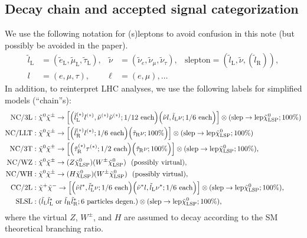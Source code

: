 \documentclass[a4paper,10pt,captions=tableheading,DIV=14]{scrartcl}
\numberwithin{equation}{section}
\newcommand\w[1]{_{\mathrm{#1}}}
\newcommand\lL{\tilde l\w L}
\newcommand\lR{\tilde l\w R}
\newcommand\neut  [1][\relax]{{\tilde\chi^0_{#1}}}
\newcommand\charP [1][\relax]{{\tilde\chi^+_{#1}}}
\newcommand\charM [1][\relax]{{\tilde\chi^-_{#1}}}
\newcommand\charPM[1][\relax]{{\tilde\chi^\pm_{#1}}}
\begin{document}
\subsection{Decay chain and accepted signal categorization}
We use the following notation for (s)leptons to avoid confusion in this note (but possibly be avoided in the paper).
\begin{align*}
\lL &= (\tilde e\w L, \tilde \mu\w L, \tilde\tau\w L),
&
\tilde\nu &= (\tilde \nu_e, \tilde\nu_\mu, \tilde\nu_\tau),
&
\text{slepton}=(\lL,\tilde\nu, (\lR)),
\\
l&=(e,\mu,\tau),
&
\ell&=(e,\mu),\dots
\end{align*}
In addition, to reinterpret LHC analyses, we use the following labels for simplified models (``chain''s):
\begin{align}
 \text{NC/3L}&: \neut\charPM\to
\left[
\Bigl(\lL^{(*)}l^{(*)},\tilde\nu^{(*)}\tilde\nu^{(*)};\text{1/12 each}\Bigr)
\Bigl(\tilde\nu l,\lL\nu;\text{1/6 each}\Bigr)
\right]
 \otimes(\text{slep}\to \text{lep}\neut[\text{LSP}]; \text{100\%})\\
 \text{NC/LLT}&: \neut\charPM\to
\left[
\Bigl(\lR^{(*)}l^{(*)};\text{1/6 each}\Bigr)
\Bigl(\tilde \tau\w R\nu;\text{100\%}\Bigr)
\right]
 \otimes(\text{slep}\to \text{lep}\neut[\text{LSP}]; \text{100\%})\\
\text{NC/3T}&: \neut\charPM\to
\left[
\Bigl(\tilde\tau\w R^{(*)}\tau^{(*)};\text{1/2 each}\Bigr)
\Bigl(\tilde \tau\w R\nu;\text{100\%}\Bigr)
\right]
 \otimes(\text{slep}\to \text{lep}\neut[\text{LSP}]; \text{100\%}),\\
 \text{NC/WZ}&: \neut\charPM\to(Z\neut[\text{LSP}])(W^\pm\neut[\text{LSP}])~~\text{(possibly virtual)},\\
 \text{NC/WH}&: \neut\charPM\to(H\neut[\text{LSP}])(W^\pm\neut[\text{LSP}])~~\text{(possibly virtual)},\\
 \text{CC/2L}&: \charP\charM\to
\left[
\Bigl(\tilde\nu l^*,\lL^*\nu;\text{1/6 each}\Bigr)
\Bigl(\tilde\nu^* l,\lL\nu^*;\text{1/6 each}\Bigr)
\right]
 \otimes(\text{slep}\to \text{lep}\neut[\text{LSP}]; \text{100\%}),\\
 \text{SLSL}&: (\lL\lL^*\text{ or }\lR\lR^*;\text{6 particles degen.})
 \otimes(\text{slep}\to \text{lep}\neut[\text{LSP}]; \text{100\%}),
\end{align}
where the virtual $Z$, $W^\pm$, and $H$ are assumed to decay according to the SM theoretical branching ratio.
\end{document}
